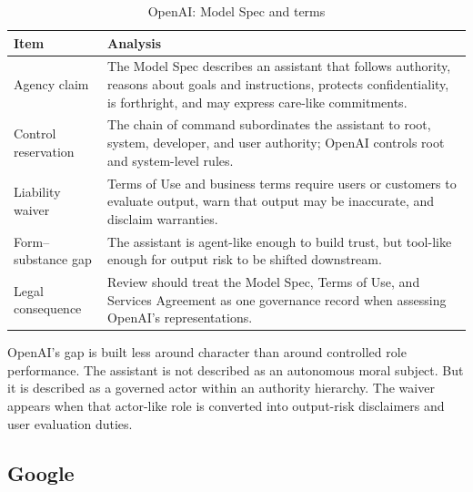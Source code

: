 \documentclass[11pt,a4paper]{article}
\begin{document}
\begin{table}[htbp]
\centering
\small
\caption{OpenAI: Model Spec and terms}
\label{tab:openai}
\begin{tabularx}{\textwidth}{@{}P{3.2cm}Y@{}}
\toprule
\textbf{Item} & \textbf{Analysis} \\
\midrule
Agency claim & The Model Spec describes an assistant that follows authority, reasons about goals and instructions, protects confidentiality, is forthright, and may express care-like commitments. \\
Control reservation & The chain of command subordinates the assistant to root, system, developer, and user authority; OpenAI controls root and system-level rules. \\
Liability waiver & Terms of Use and business terms require users or customers to evaluate output, warn that output may be inaccurate, and disclaim warranties. \\
Form--substance gap & The assistant is agent-like enough to build trust, but tool-like enough for output risk to be shifted downstream. \\
Legal consequence & Review should treat the Model Spec, Terms of Use, and Services Agreement as one governance record when assessing OpenAI's representations. \\
\bottomrule
\end{tabularx}
\end{table}

OpenAI's gap is built less around character than around controlled role performance. The assistant is not described as an autonomous moral subject. But it is described as a governed actor within an authority hierarchy. The waiver appears when that actor-like role is converted into output-risk disclaimers and user evaluation duties.

\subsection{Google}
\end{document}
